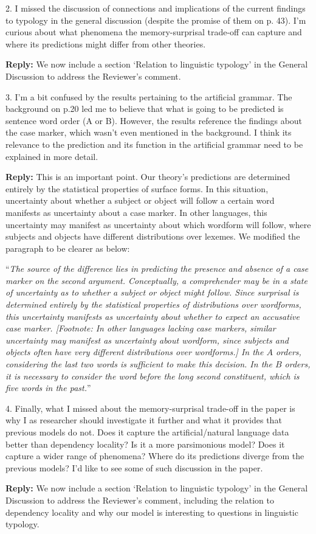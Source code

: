 \documentclass{article}[11pt,a4paper,oneside]
\newenvironment{reply}
  {\par\medskip
   \color{blue}%
   \begin{framed}
   \textbf{Reply: }\ignorespaces}
 {\end{framed}
  \medskip}
\begin{document}
2. I missed the discussion of connections and implications of the current findings to typology in the general discussion (despite the promise of them on p. 43). I'm curious about what phenomena the memory-surprisal trade-off can capture and where its predictions might differ from other theories.

\begin{reply}
	We now include a section `Relation to linguistic typology' in the General Discussion to address the Reviewer's comment. 
\end{reply}

3. I'm a bit confused by the results pertaining to the artificial grammar. The background on p.20 led me to believe that what is going to be predicted is sentence word order (A or B). However, the results reference the findings about the case marker, which wasn't even mentioned in the background. I think its relevance to the prediction and its function in the artificial grammar need to be explained in more detail.

\begin{reply}
	This is an important point. Our theory's predictions are determined entirely by the statistical properties of surface forms. In this situation, uncertainty about whether a subject or object will follow a certain word manifests as uncertainty about a case marker. In other languages, this uncertainty may manifest as uncertainty about which wordform will follow, where subjects and objects have different distributions over lexemes. We modified the paragraph to be clearer as below:
	
	``\textit{The source of the difference lies in predicting the presence and absence of a case marker on the second argument.
Conceptually, a comprehender may be in a state of uncertainty as to whether a subject or object might follow.
Since surprisal is determined entirely by the statistical properties of distributions over wordforms, this uncertainty manifests as uncertainty about whether to expect an accusative case marker.
[Footnote: In other languages lacking case markers, similar uncertainty may manifest as uncertainty about wordform, since subjects and objects often have very different distributions over wordforms.]
In the $A$ orders, considering the last two words is sufficient to make this decision.
	In the $B$ orders, it is necessary to consider the word before the long second constituent, which is five words in the past.}''
\end{reply}

4. Finally, what I missed about the memory-surprisal trade-off in the paper is why I as researcher should investigate it further and what it provides that previous models do not. Does it capture the artificial/natural language data better than dependency locality? Is it a more parsimonious model? Does it capture a wider range of phenomena? Where do its predictions diverge from the previous models? I'd like to see some of such discussion in the paper.

\begin{reply}
	We now include a section `Relation to linguistic typology' in the General Discussion to address the Reviewer's comment, including the relation to dependency locality and why our model is interesting to questions in linguistic typology.
\end{reply}
\end{document}
